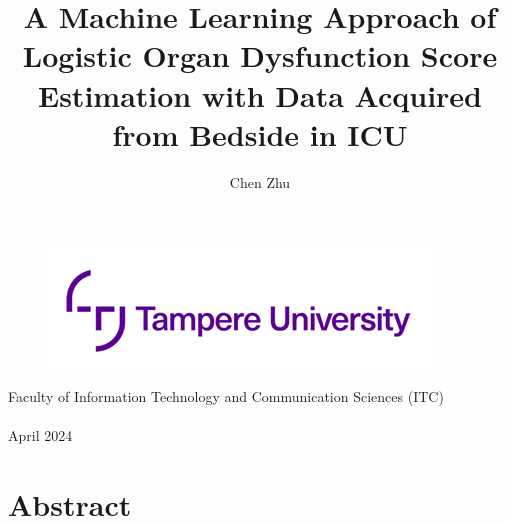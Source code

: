 \documentclass[12pt,a4paper,english
]{tunithesis}
\author{Chen Zhu}
\title{A Machine Learning Approach of Logistic Organ Dysfunction Score Estimation with Data Acquired from Bedside in ICU} %
\begin{document}
\makeatletter



%
\thispagestyle{empty}
\vspace*{-.5cm}\noindent

\begin{figure}
    \vspace{-1.3cm}
    \advance\leftskip-2.5cm
    \noindent\includegraphics{img/tunilogo.png}
\end{figure}
 
\vspace{2.5cm}
\begin{flushright}
\noindent\textsf{\LARGE{\@author}}

\noindent\vspace{0.5cm}

\noindent\Huge{\textsf{\textbf{\textcolor{tunipurple}{\@title}}}}
\end{flushright}
\vspace{10.7cm} %

\begin{flushright}  
    \begin{spacing}{1.0}
      \textsf{Faculty of Information Technology and Communication Sciences (ITC)\\
      \@thesistype\\
      April 2024}
    \end{spacing}
\end{flushright}

\if@twoside
\clearpage
\fi




\chapter*{Abstract}
\end{document}
